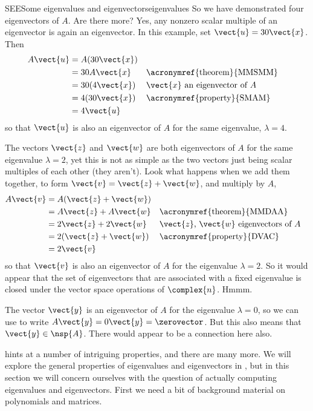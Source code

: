 \begin{example}{SEE}{Some eigenvalues and eigenvectors}{eigenvalues}
%
So we have demonstrated four eigenvectors of $A$.  Are there more?  Yes, any nonzero scalar multiple of an eigenvector is again an eigenvector.  In this example, set $\vect{u}=30\vect{x}$.  Then
%
\begin{align*}
A\vect{u}
&=A(30\vect{x})\\
&=30A\vect{x}&&\text{\acronymref{theorem}{MMSMM}}\\
&=30(4\vect{x})&&\text{$\vect{x}$ an eigenvector of $A$}\\
&=4(30\vect{x})&&\text{\acronymref{property}{SMAM}}\\
&=4\vect{u}
\end{align*}
%
so that $\vect{u}$ is also an eigenvector of $A$ for the same eigenvalue, $\lambda=4$.\par
%
The vectors $\vect{z}$ and $\vect{w}$ are both eigenvectors of $A$ for the same eigenvalue $\lambda=2$, yet this is not as simple as the two vectors just being scalar multiples of each other (they aren't).  Look what happens when we add them together, to form $\vect{v}=\vect{z}+\vect{w}$, and multiply by $A$,
%
\begin{align*}
A\vect{v}
&=A(\vect{z}+\vect{w})\\
&=A\vect{z}+A\vect{w}&&\text{\acronymref{theorem}{MMDAA}}\\
&=2\vect{z}+2\vect{w}&&\text{$\vect{z}$, $\vect{w}$ eigenvectors of $A$}\\
&=2(\vect{z}+\vect{w})&&\text{\acronymref{property}{DVAC}}\\
&=2\vect{v}
\end{align*}
%
so that $\vect{v}$ is also an eigenvector of $A$ for the eigenvalue $\lambda=2$.  So it would appear that the set of eigenvectors that are associated with a fixed eigenvalue is closed under the vector space operations of $\complex{n}$.  Hmmm.\par
%
The vector $\vect{y}$ is an eigenvector of $A$ for the eigenvalue $\lambda=0$, so we can use  to write $A\vect{y}=0\vect{y}=\zerovector$.  But this also means that $\vect{y}\in\nsp{A}$.  There would appear to be a connection here also.
%
\end{example}
%
%
 hints at a number of intriguing properties, and there are many more.  We will explore the general properties of eigenvalues and eigenvectors in , but in this section we will concern ourselves with the question of actually computing eigenvalues and eigenvectors.  First we need a bit of background material on polynomials and matrices.
